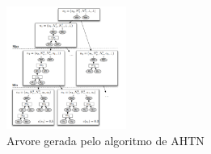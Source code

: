 \begin{figure}[ht]
	\centering
	\includegraphics[width=0.35\textwidth]{fig/ahtn.pdf}
	\caption{Arvore gerada pelo algoritmo de AHTN}
	\label{fig:ahtn}
\end{figure} 
